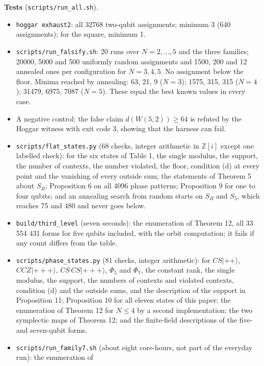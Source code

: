 \documentclass[11pt,a4paper]{article}
\providecommand{\tightlist}{\setlength{\itemsep}{0pt}\setlength{\parskip}{0pt}}
\begin{document}
\textbf{Tests} (\nolinkurl{scripts/run_all.sh}).

\begin{itemize}
\tightlist
\item
  \texttt{hoggar\ exhaust2}: all 32768 two-qubit assignments; minimum 3 (640 assignments); for the square,
  minimum 1.
\item
  \nolinkurl{scripts/run_falsify.sh}: 20 runs over \(N = 2, \dots, 5\) and the three families; 20000, 5000 and 500
  uniformly random assignments and 1500, 200 and 12 annealed ones per configuration for
  \(N = 3, 4, 5\). No assignment below the floor. Minima reached by annealing: 63, 21, 9 (\(N=3\));
  1575, 315, 315 (\(N=4\)); 31479, 6975, 7087 (\(N=5\)). These equal the best known values in every case.
\item
  A negative control: the false claim \(d(W(5,2)) \ge 64\) is refuted by the Hoggar witness with exit
  code 3, showing that the harness can fail.
\item
  \nolinkurl{scripts/flat_states.py} (68 checks, integer arithmetic in \(\mathbb{Z}[i]\) except one labelled check):
  for the six states of Table 1, the single modulus, the support, the number of contexts, the number
  violated, the floor, condition (d) at every point and the vanishing of every outside sum; the statements
  of Theorem 5 about \(S_B\); Proposition 6 on all 4096 phase patterns; Proposition 9 for one to four
  qubits; and an annealing search from random starts on \(S_B\) and \(S_5\), which reaches 75 and 480 and
  never goes below.
\item
  \texttt{build/third\_level} (seven seconds): the enumeration of Theorem 12, all 33 554 431 forms for five
  qubits included, with the orbit computation; it fails if any count differs from the table.
\item
  \nolinkurl{scripts/phase_states.py} (81 checks, integer arithmetic): for \(CS|{+}{+}\rangle\), \(CCZ|{+}{+}{+}\rangle\),
  \(CS\,CS|{+}{+}{+}\rangle\), \(\Phi_5\) and \(\Phi_7\), the constant rank, the single modulus, the support, the
  numbers of contexts and violated contexts, condition (d) and the outside sums, and the description of
  the support in Proposition 11; Proposition 10 for all eleven states of this paper; the enumeration of
  Theorem 12 for \(N \le 4\) by a second implementation; the two symplectic maps of Theorem 12; and the
  finite-field descriptions of the five- and seven-qubit forms.
\item
  \nolinkurl{scripts/run_family7.sh} (about eight core-hours, not part of the everyday run): the enumeration of

\end{itemize}
\end{document}
